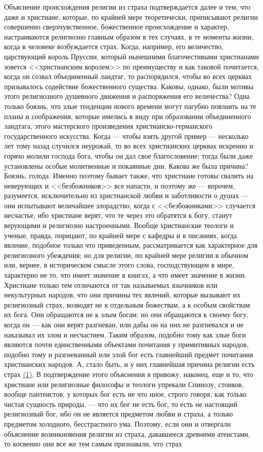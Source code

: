 \documentclass[12pt]{article}
\begin{document}
Объяснение происхождения религии из страха подтверждается далее и тем, что даже и христиане, которые, по крайней мере теоретически, приписывают религии совершенно сверхчувственное, божественное происхождение и характер, настраиваются религиозно главным образом в тех случаях, в те моменты жизни, когда в человеке возбуждается страх. Когда, например, его величество, царствующий король Пруссии, который нынешними благочестивыми христианами зовется <<христианским королем>> по преимуществу и как таковой почитается, когда он созвал объединенный ландтаг, то распорядился, чтобы во всех церквах призывалось содействие божественного существа. Каковы, однако, были мотивы этого религиозного душевного движения и распоряжения его величества? Одна только боязнь, что злые тенденции нового времени могут пагубно повлиять на те планы и соображения, которые имелись в виду при образовании объединенного ландтага, этого мастерского произведения христианско-германского государственного искусства. Когда --- чтобы взять другой пример --- несколько лет тому назад случился неурожай, то во всех христианских церквах искренно и горячо молили господа бога, чтобы он дал свое благословение; тогда были даже установлены особые молитвенные и покаянные дни. Какова же была причина? Боязнь, голода. Именно поэтому бывает также, что христиане готовы свалить на неверующих и <<безбожников>> все напасти, и поэтому же --- впрочем, разумеется, исключительно из христианской любви и заботливости о душах --- они испытывают величайшее злорадство, когда с <<безбожниками>> случается несчастье, ибо христиане верят, что те через это обратятся к богу, станут верующими и религиозно настроенными. Вообще христианские теологи и ученые, правда, порицают, по крайней мере с кафедры и в писаниях, когда явление, подобное только что приведенным, рассматривается как характерное для религиозного убеждения; но для религии, по крайней мере религии в обычном или, вернее, в историческом смысле этого слова, господствующем в мире, характерно не то, что имеет значение в книгах, а что имеет значение в жизни. Христиане только тем отличаются от так называемых язычников или некультурных народов, что они причины тех явлений, которые вызывают их религиозный страх, возводят не к отдельным божествам, а к особым свойствам их бога. Они обращаются не к злым богам; но они обращаются к своему богу, когда он --- как они верят разгневан, или дабы он на них не разгневался и не наказывал их злом и несчастием. Таким образом, подобно тому как злые боги являются почти единственными объектами почитания у примитивных народов, подобно тому и разгневанный или злой бог есть главнейший предмет почитания христианских народов. А, стало быть, и у них главнейшая причина религии есть страх \hyperlink{1}{(1)}\hypertarget{b1}{}. В подтверждение этого объяснения я привожу, наконец, еще и то, что христиане или религиозные философы и теологи упрекали Спинозу, стоиков, вообще пантеистов, у которых бог есть не что иное, строго говоря, как только чистая сущность природы, --- что их бог не есть бог, то есть не настоящий религиозный бог, ибо он не является предметом любви и страха, а только предметом холодного, бесстрастного ума. Поэтому, если они и отвергали объяснение возникновения религии из страха, дававшееся древними атеистами, то косвенно они все же тем самым признавали, что страх 
\end{document}

